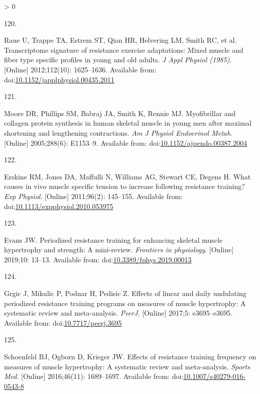 \documentclass[twoside,10pt]{gihclass} %
\newlength{\cslhangindent}
\newlength{\csllabelwidth}
\newenvironment{CSLReferences}[3] %
 {%
  \setlength{\parindent}{0pt}
  \ifodd #1 \everypar{\setlength{\hangindent}{\cslhangindent}}\ignorespaces\fi
  \ifnum #2 > 0
  \setlength{\parskip}{#2\baselineskip}
  \fi
 }%
 {}
\newcommand{\CSLLeftMargin}[1]{\parbox[t]{\maxof{\widthof{#1}}{\csllabelwidth}}{#1}}
\newcommand{\CSLRightInline}[1]{\parbox[t]{\linewidth}{#1}}
\begin{document}
\begin{CSLReferences}{0}{0}
\leavevmode\hypertarget{ref-RN774}{}%
\CSLLeftMargin{120. }
\CSLRightInline{Raue U, Trappe TA, Estrem ST, Qian HR, Helvering LM, Smith RC, et al. Transcriptome signature of resistance exercise adaptations: Mixed muscle and fiber type specific profiles in young and old adults. \emph{J Appl Physiol (1985)}. {[}Online{]} 2012;112(10): 1625--1636. Available from: doi:\href{https://doi.org/10.1152/japplphysiol.00435.2011}{10.1152/japplphysiol.00435.2011}}

\leavevmode\hypertarget{ref-RN2457}{}%
\CSLLeftMargin{121. }
\CSLRightInline{Moore DR, Phillips SM, Babraj JA, Smith K, Rennie MJ. Myofibrillar and collagen protein synthesis in human skeletal muscle in young men after maximal shortening and lengthening contractions. \emph{Am J Physiol Endocrinol Metab}. {[}Online{]} 2005;288(6): E1153--9. Available from: doi:\href{https://doi.org/10.1152/ajpendo.00387.2004}{10.1152/ajpendo.00387.2004}}

\leavevmode\hypertarget{ref-RN1504}{}%
\CSLLeftMargin{122. }
\CSLRightInline{Erskine RM, Jones DA, Maffulli N, Williams AG, Stewart CE, Degens H. What causes in vivo muscle specific tension to increase following resistance training? \emph{Exp Physiol}. {[}Online{]} 2011;96(2): 145--155. Available from: doi:\href{https://doi.org/10.1113/expphysiol.2010.053975}{10.1113/expphysiol.2010.053975}}

\leavevmode\hypertarget{ref-RN2575}{}%
\CSLLeftMargin{123. }
\CSLRightInline{Evans JW. Periodized resistance training for enhancing skeletal muscle hypertrophy and strength: A mini-review. \emph{Frontiers in physiology}. {[}Online{]} 2019;10: 13--13. Available from: doi:\href{https://doi.org/10.3389/fphys.2019.00013}{10.3389/fphys.2019.00013}}

\leavevmode\hypertarget{ref-RN2572}{}%
\CSLLeftMargin{124. }
\CSLRightInline{Grgic J, Mikulic P, Podnar H, Pedisic Z. Effects of linear and daily undulating periodized resistance training programs on measures of muscle hypertrophy: A systematic review and meta-analysis. \emph{PeerJ}. {[}Online{]} 2017;5: e3695--e3695. Available from: doi:\href{https://doi.org/10.7717/peerj.3695}{10.7717/peerj.3695}}

\leavevmode\hypertarget{ref-RN2571}{}%
\CSLLeftMargin{125. }
\CSLRightInline{Schoenfeld BJ, Ogborn D, Krieger JW. Effects of resistance training frequency on measures of muscle hypertrophy: A systematic review and meta-analysis. \emph{Sports Med}. {[}Online{]} 2016;46(11): 1689--1697. Available from: doi:\href{https://doi.org/10.1007/s40279-016-0543-8}{10.1007/s40279-016-0543-8}}


\end{CSLReferences}
\end{document}
